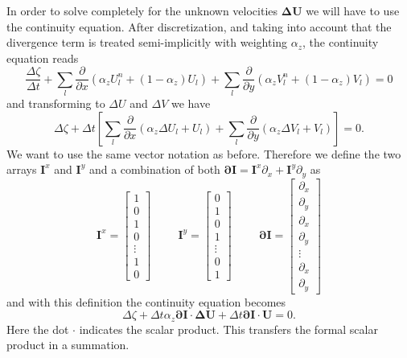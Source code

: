 \documentclass[12pt,draft]{article}
\newcommand{\Unew}{U^n}
\newcommand{\Vnew}{V^n}
\newcommand{\Uold}{U}
\newcommand{\Vold}{V}
\newcommand{\Udel}{\Delta U}
\newcommand{\Vdel}{\Delta V}
\newcommand{\zdel}{\Delta \zeta}
\newcommand{\UV}{\mathbf{U}}
\newcommand{\UVdel}{\mathbf{\Delta U}}
\newcommand{\II}{\mathbf{I}}
\newcommand{\Ipart}{\mathbf{\partial I}}
\newcommand{\dt}{\Delta t}
\newcommand{\delx}{\partial_x}
\newcommand{\dely}{\partial_y}
\newcommand{\dpartx}[1]{\frac{\partial #1}{\partial x}}
\newcommand{\dparty}[1]{\frac{\partial #1}{\partial y}}
\begin{document}
In order to solve completely for the unknown velocities $\UVdel$
we will have to use the continuity equation. After discretization,
and taking into account that the divergence term is treated
semi-implicitly with weighting $\alpha_z$, the continuity
equation reads
\begin{equation}
	\frac{\zdel}{\dt}
	+ \sum_l \dpartx{}(\alpha_z\Unew_l+(1-\alpha_z)\Uold_l) 
	+ \sum_l \dparty{}(\alpha_z\Vnew_l+(1-\alpha_z)\Vold_l) 
	= 0
\end{equation}
and transforming to $\Udel$ and $\Vdel$ we have
\begin{equation}
	\zdel
	+ \dt \left[
	   \sum_l \dpartx{}(\alpha_z\Udel_l+\Uold_l) 
	+ \sum_l \dparty{}(\alpha_z\Vdel_l+\Vold_l) 
	\right] 
	= 0.
\end{equation}
We want to use the same vector notation as before. Therefore
we define the two arrays 
$\II^x$ and $\II^y$ and a combination of both
$\Ipart = \II^x\delx + \II^y\dely$ as
\begin{equation}
\II^x =
\begin{bmatrix}
1 \\ 0 \\ 1 \\ 0 \\ \vdots \\ 1 \\ 0 
\end{bmatrix}
\hspace{1cm}
\II^y =
\begin{bmatrix}
0 \\ 1 \\ 0 \\ 1 \\ \vdots \\ 0 \\ 1
\end{bmatrix}
\hspace{1cm}
\Ipart =
\begin{bmatrix}
\delx \\ \dely \\ \delx \\ \dely \\ \vdots \\ \delx \\ \dely
\end{bmatrix}
\end{equation}
and with this definition the continuity equation becomes
\begin{equation}
	\label{conti_final}
	\zdel
	+ \dt\alpha_z\Ipart\cdot\UVdel
	+ \dt\Ipart\cdot\UV
	= 0.
\end{equation}
Here the dot $\cdot$ indicates the scalar product. This transfers 
the formal scalar product in a summation.
\end{document}
